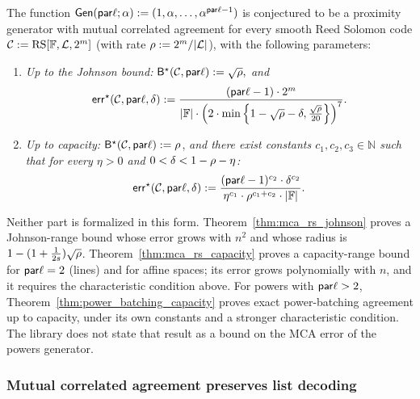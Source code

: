 \begin{remark}\label{conjecture:whir}
    The function $\mathsf{Gen}(\mathsf{par}\ell; \alpha) := (1, \alpha, \ldots, \alpha^{\mathsf{par}\ell - 1})$ is conjectured
    to be a proximity generator with mutual correlated agreement for every smooth Reed Solomon
    code $\mathcal{C} := \mathrm{RS}[\mathbb{F}, \mathcal{L}, 2^m]$ (with rate $\rho := 2^m /
    |\mathcal{L}|$), with the following parameters:
    \begin{enumerate}
        \item \textit{Up to the Johnson bound:} ${\mathsf{B}}^\star(\mathcal{C}, \mathsf{par}\ell) := \sqrt{\rho},$ \textit{and}
        \[
        \mathsf{err}^\star(\mathcal{C}, \mathsf{par}\ell, \delta) := \frac{(\mathsf{par}\ell - 1) \cdot 2^m}{|\mathbb{F}| \cdot \left( 2 \cdot \min\left\{1 - \sqrt{\rho} - \delta, \frac{\sqrt{\rho}}{20} \right\} \right)^7}.
        \]

        \item \textit{Up to capacity:} ${\mathsf{B}}^\star(\mathcal{C}, \mathsf{par}\ell) := \rho$, \textit{and there exist constants $c_1, c_2, c_3 \in \mathbb{N}$ such that for every $\eta > 0$ and $0 < \delta < 1 - \rho - \eta$:}
        \[
        \mathsf{err}^\star(\mathcal{C}, \mathsf{par}\ell, \delta) := \frac{(\mathsf{par}\ell - 1)^{c_2} \cdot \delta^{c_2}}{\eta^{c_1} \cdot \rho^{c_1 + c_2} \cdot |\mathbb{F}|}.
        \]
      \end{enumerate}
    Neither part is formalized in this form. Theorem~\ref{thm:mca_rs_johnson} proves a
    Johnson-range bound whose error grows with $n^2$ and whose radius is
    $1-(1+\frac{1}{2s})\sqrt{\rho}$. Theorem~\ref{thm:mca_rs_capacity} proves a capacity-range
    bound for $\mathsf{par}\ell=2$ (lines) and for affine spaces; its error grows polynomially with $n$, and
    it requires the characteristic condition above. For powers with $\mathsf{par}\ell>2$,
    Theorem~\ref{thm:power_batching_capacity} proves exact power-batching agreement up to capacity,
    under its own constants and a stronger characteristic condition. The library does not state
    that result as a bound on the MCA error of the powers generator.
\end{remark}

\subsubsection{Mutual correlated agreement preserves list decoding}

